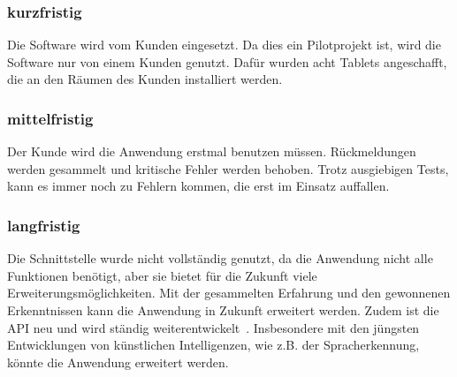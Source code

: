 \subsubsection{kurzfristig}\label{subsubsec:kurzfristig}
Die Software wird vom Kunden eingesetzt.
Da dies ein Pilotprojekt ist, wird die Software nur von einem Kunden genutzt.
Dafür wurden acht Tablets angeschafft, die an den Räumen des Kunden installiert werden.

\subsubsection{mittelfristig}\label{subsubsec:mittelfristig}
Der Kunde wird die Anwendung erstmal benutzen müssen.
Rückmeldungen werden gesammelt und kritische Fehler werden behoben.
Trotz ausgiebigen Tests, kann es immer noch zu Fehlern kommen, die erst im Einsatz auffallen.
\subsubsection{langfristig}\label{subsubsec:langfristig}
Die Schnittstelle wurde nicht vollständig genutzt, da die Anwendung nicht alle Funktionen benötigt, aber sie bietet für die Zukunft viele Erweiterungsmöglichkeiten.
Mit der gesammelten Erfahrung und den gewonnenen Erkenntnissen kann die Anwendung in Zukunft erweitert werden.
Zudem ist die API neu und wird ständig weiterentwickelt~\cite{microsoft-graph-api-version}.
Insbesondere mit den jüngsten Entwicklungen von künstlichen Intelligenzen, wie z.B. der Spracherkennung, könnte die Anwendung erweitert werden.

